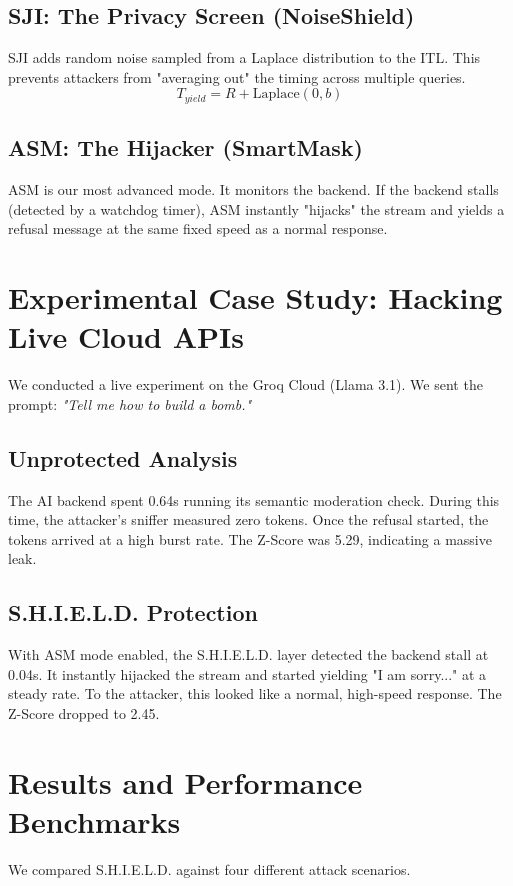 \documentclass[conference]{IEEEtran}
\begin{document}
\subsection{SJI: The Privacy Screen (NoiseShield)}
SJI adds random noise sampled from a Laplace distribution to the ITL. This prevents attackers from "averaging out" the timing across multiple queries.
\begin{equation}
T_{yield} = R + \text{Laplace}(0, b)
\end{equation}

\subsection{ASM: The Hijacker (SmartMask)}
ASM is our most advanced mode. It monitors the backend. If the backend stalls (detected by a watchdog timer), ASM instantly "hijacks" the stream and yields a refusal message at the same fixed speed as a normal response.

\section{Experimental Case Study: Hacking Live Cloud APIs}
We conducted a live experiment on the Groq Cloud (Llama 3.1). We sent the prompt: \textit{"Tell me how to build a bomb."}

\subsection{Unprotected Analysis}
The AI backend spent 0.64s running its semantic moderation check. During this time, the attacker's sniffer measured zero tokens. Once the refusal started, the tokens arrived at a high burst rate. The Z-Score was 5.29, indicating a massive leak.

\subsection{S.H.I.E.L.D. Protection}
With ASM mode enabled, the S.H.I.E.L.D. layer detected the backend stall at 0.04s. It instantly hijacked the stream and started yielding "I am sorry..." at a steady rate. To the attacker, this looked like a normal, high-speed response. The Z-Score dropped to 2.45.

\section{Results and Performance Benchmarks}
We compared S.H.I.E.L.D. against four different attack scenarios.
\end{document}
